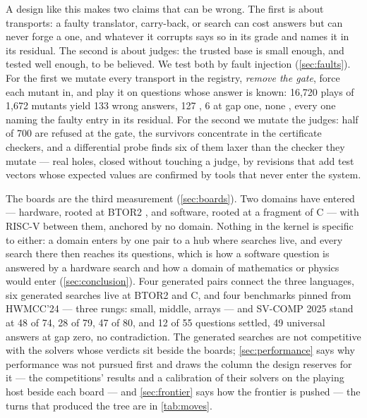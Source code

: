 A design like this makes two claims that can be wrong. The first is
about transports: a faulty translator, carry-back, or search can cost
answers but can never forge a  one, and whatever it
corrupts says so in its grade and names it in its residual. The
second is about judges: the trusted base is small enough, and tested
well enough, to be believed. We test both by fault injection
(\cref{sec:faults}). For the first we mutate every transport in the
registry, \emph{remove the gate}, force each mutant in, and play it
on questions whose answer is known: 16,720 plays of 1,672 mutants
yield 133 wrong answers, 127 , 6  at
gap one, none , every one naming the faulty entry in
its residual. For the second we mutate the judges: half of 700 are
refused at the gate, the survivors concentrate in the certificate
checkers, and a differential probe finds six of them laxer than the
checker they mutate --- real holes, closed without touching a judge,
by revisions that add test vectors whose expected values are
confirmed by tools that never enter the system.

The boards are the third measurement (\cref{sec:boards}). Two domains
have entered --- hardware, rooted at BTOR2 \citep{niemetz2018btor2},
and software, rooted at a fragment of C --- with RISC-V between them,
anchored by no domain. Nothing in the kernel is specific to either:
a domain enters by one pair to a hub where searches live, and every
search there then reaches its questions, which is how a software
question is answered by a hardware search and how a domain of
mathematics or physics would enter (\cref{sec:conclusion}). Four
generated pairs connect the three
languages, six generated searches live at BTOR2 and C, and four
benchmarks pinned from HWMCC'24 --- three rungs: small, middle,
arrays --- and SV-COMP 2025 stand at 48 of 74,
28 of 79, 47 of 80, and 12 of 55 questions settled, 49 universal
answers  at gap zero, no contradiction. The
generated searches are not competitive with the solvers whose
verdicts sit beside the boards; \cref{sec:performance} says why
performance was not pursued first and draws the column the design
reserves for it --- the competitions' results and a calibration of
their solvers on the playing host beside each board --- and \cref{sec:frontier} says how the frontier is pushed --- the
turns that produced the tree are in \cref{tab:moves}.

